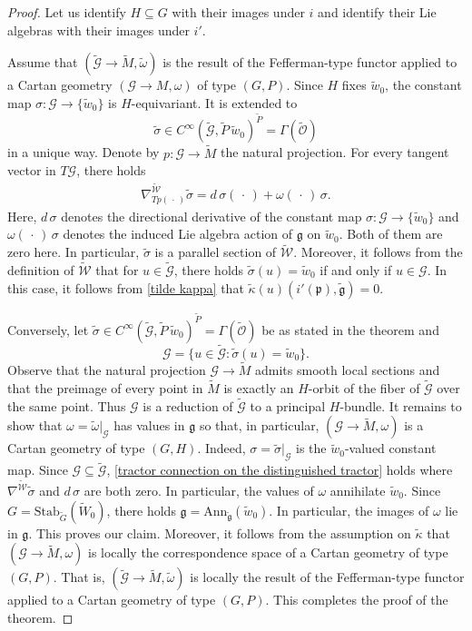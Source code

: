 \documentclass[10pt,a4paper]{amsart}
\begin{document}
\begin{proof}
Let us identify $H\subseteq G$ with their images under $i$ and identify their Lie algebras with their images under $i'$.

Assume that $(\tilde{\mathcal G}\to\tilde M,\tilde\omega)$ is the result of the Fefferman-type functor applied to a Cartan geometry $(\mathcal G\to M,\omega)$ of type $(G,P)$. Since $H$ fixes $\tilde w_0$, the constant map $\sigma:\mathcal G\to\{\tilde w_0\}$ is $H$-equivariant. It is extended to 
\[\tilde\sigma\in C^\infty(\tilde{\mathcal G},\tilde P\,\tilde w_0)^{\tilde P}=\Gamma(\tilde{\mathcal O})\]
in a unique way. Denote by $p:\mathcal G\to \tilde M$ the natural projection. For every tangent vector in $T\mathcal G$, there holds
\begin{align}\label{tractor connection on the distinguished tractor}
    \nabla^{\tilde{\mathcal W}}_{Tp(\,\cdot\,)}\tilde\sigma=d\,\sigma(\,\cdot\,)+\omega(\,\cdot\,)\,\sigma.
\end{align}
Here, $d\,\sigma$ denotes the directional derivative of the constant map $\sigma:\mathcal G\to\{\tilde w_0\}$ and $\omega(\,\cdot\,)\,\sigma$ denotes the induced Lie algebra action of $\mathfrak g$ on $\tilde w_0$. Both of them are zero here. In particular, $\tilde\sigma$ is a parallel section of $\tilde{\mathcal W}$. Moreover, it follows from the definition of $\tilde{\mathcal W}$ that for $u\in\tilde{\mathcal G}$, there holds $\tilde\sigma(u)=\tilde w_0$ if and only if $u\in\mathcal G$. In this case, it follows from \eqref{tilde kappa} that $\tilde\kappa(u)(i'(\mathfrak p),\tilde{\mathfrak g})=0$.

Conversely, let $\tilde\sigma\in C^\infty(\tilde{\mathcal G},\tilde P\,\tilde w_0)^{\tilde P}=\Gamma(\tilde{\mathcal O})$ be as stated in the theorem and
\[\mathcal G=\{u\in\tilde{\mathcal G}:\tilde\sigma(u)=\tilde w_0\}.\]
Observe that the natural projection $\mathcal G\to\tilde M$ admits smooth local sections and that the preimage of every point in $\tilde M$ is exactly an $H$-orbit of the fiber of $\tilde{\mathcal G}$ over the same point. Thus $\mathcal G$ is a reduction of $\tilde{\mathcal G}$ to a principal $H$-bundle. It remains to show that $\omega=\tilde\omega|_{\mathcal G}$ has values in $\mathfrak g$ so that, in particular, $(\mathcal G\to\tilde M,\omega)$ is a Cartan geometry of type $(G,H)$. Indeed, $\sigma=\tilde\sigma|_{\mathcal G}$ is the $\tilde w_0$-valued constant map. Since $\mathcal G\subseteq\tilde{\mathcal G}$, \eqref{tractor connection on the distinguished tractor} holds where $\nabla^{\tilde{\mathcal W}}\tilde\sigma$ and $d\,\sigma$ are both zero. In particular, the values of $\omega$ annihilate $\tilde w_0$. Since $G=\mathrm{Stab}_{\tilde G}(\tilde W_0)$, there holds $\mathfrak g=\mathrm{Ann}_{\tilde{\mathfrak g}}(\tilde w_0)$. In particular, the images of $\omega$ lie in $\mathfrak g$. This proves our claim. Moreover, it follows from the assumption on $\tilde\kappa$ that $(\mathcal G\to\tilde M,\omega)$ is locally the correspondence space of a Cartan geometry of type $(G,P)$. That is, $(\tilde{\mathcal G}\to\tilde M,\tilde\omega)$ is locally the result of the Fefferman-type functor applied to a Cartan geometry of type $(G,P)$. This completes the proof of the theorem.
\end{proof}
\end{document}
